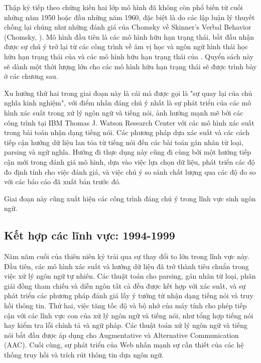 Thập kỷ tiếp theo chứng kiến hai lớp mô hình đã không còn phổ biến từ cuối những năm 1950 hoặc đầu những năm 1960, đặc biệt là do các lập luận lý thuyết chống lại chúng như những đánh giá của Chomsky về Skinner's Verbal Behavior (Chomsky, \citeyear{cogprints1148}). Mô hình đầu tiên là các mô hình hữu hạn trạng thái, bắt đầu nhận được sự chú ý trở lại từ các công trình về âm vị học và ngôn ngữ hình thái học hữu hạn trạng thái của \citet{kaplan1981phonological} và các mô hình hữu hạn trạng thái của \citet{church1980memory}. Quyển sách này sẽ dành một thời lượng lớn cho các mô hình hữu hạn trạng thái sẽ được trình bày ở các chương sau.

Xu hướng thứ hai trong giai đoạn này là cái mà được gọi là "sự quay lại của chủ nghĩa kinh nghiệm", với điểm nhấn đáng chú ý nhất là sự phát triển của các mô hình xác suất trong xử lý ngôn ngữ và tiếng nói, ảnh hưởng mạnh mẽ bởi các công trình tại IBM Thomas J. Watson Research Center với các mô hình xác suất trong bài toán nhận dạng tiếng nói. Các phương pháp dựa xác suất và các cách tiếp cận hướng dữ liệu lan tỏa từ tiếng nói đến các bài toán gán nhãn từ loại, parsing và ngữ nghĩa. Hướng đi thực dụng này cũng đi cùng bởi một hướng tiếp cận mới trong đánh giá mô hình, dựa vào việc lựa chọn dữ liệu, phát triển các độ đo định tính cho việc đánh giá, và việc chú ý so sánh chất lượng qua các độ đo so với các báo cáo đã xuất bản trước đó.

Giai đoạn này cũng xuất hiện các công trình đáng chú ý trong lĩnh vực sinh ngôn ngữ.

\subsection{Kết hợp các lĩnh vực: 1994-1999}

Năm năm cuối của thiên niên kỷ trải qua sự thay đổi to lớn trong lĩnh vực này. Đầu tiên, các mô hình xác suất và hướng dữ liệu đã trở thành tiêu chuẩn trong việc xử lý ngôn ngữ tự nhiên. Các thuật toán cho parsing, gán nhãn từ loại, phân giải đồng tham chiếu và diễn ngôn tất cả đều được kết hợp với xác suất, và sự phát triển các phương pháp đánh giá lấy ý tưởng từ nhận dạng tiếng nói và truy hồi thông tin. Thứ hai, việc tăng tốc độ và bộ nhớ của máy tính cho phép tiếp cận với các lĩnh vực con của xử lý ngôn ngữ và tiếng nói, như tổng hợp tiếng nói hay kiểm tra lỗi chính tả và ngữ pháp. Các thuật toán xử lý ngôn ngữ và tiếng nói bắt đầu được áp dụng cho Augmentative và Alternative Communication (AAC). Cuối cùng, sự phát triển của Web nhấn mạnh sự cần thiết của các hệ thống truy hồi và trích rút thông tin dựa ngôn ngữ.

